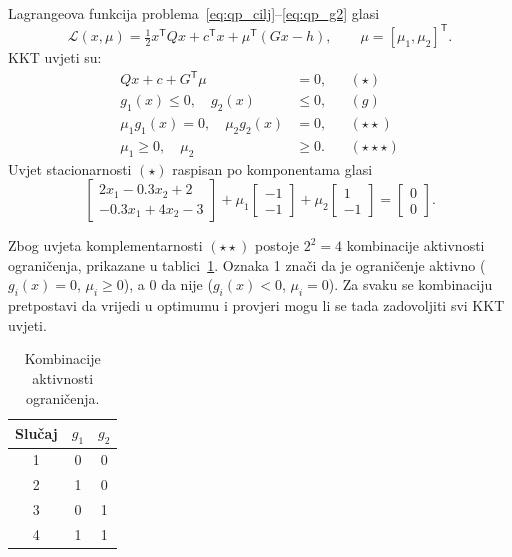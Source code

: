 Lagrangeova funkcija problema~\eqref{eq:qp_cilj}--\eqref{eq:qp_g2} glasi
\begin{equation}
\mathcal{L}(x, \mu) = \tfrac{1}{2} x^{\mathsf{T}} Q x + c^{\mathsf{T}} x + \mu^{\mathsf{T}} (Gx - h), \qquad \mu = [\mu_1, \mu_2]^{\mathsf{T}}.
\end{equation}
KKT uvjeti su:
\begin{align}
Qx + c + G^{\mathsf{T}} \mu &= 0, & &(\star) \label{eq:kkt_grad} \\
g_1(x) \leq 0, \quad g_2(x) &\leq 0, & &(g) \label{eq:kkt_prim} \\
\mu_1 g_1(x) = 0, \quad \mu_2 g_2(x) &= 0, & &(\star\star) \label{eq:kkt_compl} \\
\mu_1 \geq 0, \quad \mu_2 &\geq 0. & &(\star\star\star) \label{eq:kkt_dual}
\end{align}
Uvjet stacionarnosti $(\star)$ raspisan po komponentama glasi
\begin{equation}
\begin{bmatrix} 2x_1 - 0.3x_2 + 2 \\ -0.3x_1 + 4x_2 - 3 \end{bmatrix}
+ \mu_1 \begin{bmatrix} -1 \\ -1 \end{bmatrix}
+ \mu_2 \begin{bmatrix} 1 \\ -1 \end{bmatrix}
= \begin{bmatrix} 0 \\ 0 \end{bmatrix}.
\label{eq:kkt_grad_raspis}
\end{equation}

Zbog uvjeta komplementarnosti $(\star\star)$ postoje $2^2 = 4$ kombinacije aktivnosti ograničenja, prikazane u tablici~\ref{tab:kkt_slucajevi}. Oznaka 1 znači da je ograničenje aktivno ($g_i(x) = 0$, $\mu_i \geq 0$), a 0 da nije ($g_i(x) < 0$, $\mu_i = 0$). Za svaku se kombinaciju pretpostavi da vrijedi u optimumu i provjeri mogu li se tada zadovoljiti svi KKT uvjeti.

\begin{table}[H]
\centering
\caption{Kombinacije aktivnosti ograničenja.}
\label{tab:kkt_slucajevi}
\begin{tabular}{ccc}
\toprule
\textbf{Slučaj} & $g_1$ & $g_2$ \\
\midrule
1 & 0 & 0 \\
2 & 1 & 0 \\
3 & 0 & 1 \\
4 & 1 & 1 \\
\bottomrule
\end{tabular}
\end{table}

